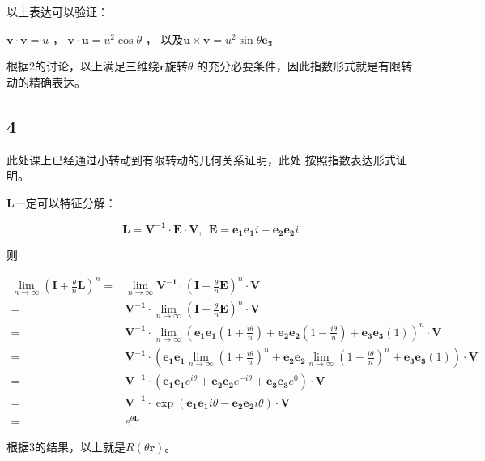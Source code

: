 \documentclass[UTF8,zihao=5]{ctexart}
\begin{document}
以上表达可以验证：

$
\bm{v}\cdot\bm{v}=u
$
，
$
\bm{v}\cdot\bm{u}=u^2\cos\theta
$
，
以及$\bm{u}\times\bm{v}=u^2\sin\theta\bm{e_3}$

根据2的讨论，以上满足三维绕$\bm{r}$旋转$\theta$
的充分必要条件，因此指数形式就是有限转动的精确表达。

\subsection*{4}

此处课上已经通过小转动到有限转动的几何关系证明，此处
按照指数表达形式证明。

$\bm{L}$一定可以特征分解：

$$
\bm{L}=\bm{V^{-1}\cdot E\cdot V},\ \ 
\bm{E}=\bm{e_1}\bm{e_1}i-\bm{e_2}\bm{e_2}i
$$

则

\begin{equation*}
\begin{split}
\lim_{n\rightarrow\infty}{
\left(
    \bm{I}
    +
    \frac{\theta}{n}
    \bm{L}
\right)^n
}
=&
\lim_{n\rightarrow\infty}{
    \bm{V^{-1}}\cdot 
    \left(
        \bm{I}
        +
        \frac{\theta}{n}
        \bm{E}
    \right)^n
    \cdot \bm{V}
}
\\=&
\bm{V^{-1}}\cdot 
\lim_{n\rightarrow\infty}{
    \left(
        \bm{I}
        +
        \frac{\theta}{n}
        \bm{E}
    \right)^n
}\cdot \bm{V}
\\=&
\bm{V^{-1}}\cdot 
\lim_{n\rightarrow\infty}{
    \left(
        \bm{e_1e_1}(1+\frac{i\theta}{n})
        +\bm{e_2e_2}(1-\frac{i\theta}{n})
        +\bm{e_3e_3}(1)
    \right)^n
}\cdot \bm{V}
\\=&
\bm{V^{-1}}\cdot 
    \left(
        \bm{e_1e_1}
        \lim_{n\rightarrow\infty}
        {(1+\frac{i\theta}{n})^n}
        +\bm{e_2e_2}
        \lim_{n\rightarrow\infty}
        {(1-\frac{i\theta}{n})^n}
        +\bm{e_3e_3}(1)
    \right)\cdot \bm{V}
\\=&
\bm{V^{-1}}\cdot 
\left(
    \bm{e_1e_1}
    e^{i\theta}
    +\bm{e_2e_2}
    e^{-i\theta}
    +\bm{e_3e_3}e^0
\right)\cdot \bm{V}
\\=&
\bm{V^{-1}}\cdot 
\exp\left(
    \bm{e_1e_1}
    i\theta
    -\bm{e_2e_2}
    i\theta
\right)\cdot \bm{V}
\\=&
e^{\theta \bm{L}}
\end{split}
\end{equation*}

根据3的结果，以上就是$R(\theta\bm{r})$。
\end{document}
